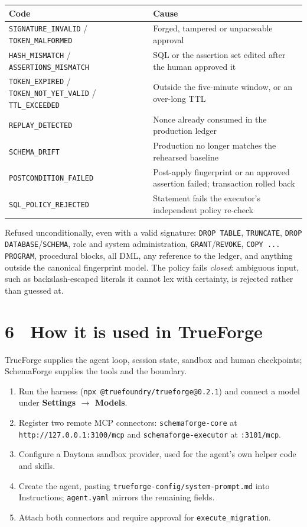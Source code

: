 \documentclass[8pt,a4paper]{extarticle}
\newcommand{\code}[1]{\texttt{\small #1}}
\begin{document}
\begin{tabularx}{\linewidth}{@{}lX@{}}
\toprule
\textbf{Code} & \textbf{Cause} \\
\midrule
\code{SIGNATURE\_INVALID} / \code{TOKEN\_MALFORMED} & Forged, tampered or unparseable approval \\
\code{HASH\_MISMATCH} / \code{ASSERTIONS\_MISMATCH} & SQL or the assertion set edited after the human approved it \\
\code{TOKEN\_EXPIRED} / \code{TOKEN\_NOT\_YET\_VALID} / \code{TTL\_EXCEEDED} & Outside the five-minute window, or an over-long TTL \\
\code{REPLAY\_DETECTED} & Nonce already consumed in the production ledger \\
\code{SCHEMA\_DRIFT} & Production no longer matches the rehearsed baseline \\
\code{POSTCONDITION\_FAILED} & Post-apply fingerprint or an approved assertion failed; transaction rolled back \\
\code{SQL\_POLICY\_REJECTED} & Statement fails the executor's independent policy re-check \\
\bottomrule
\end{tabularx}

\vspace{0.5ex}
Refused unconditionally, even with a valid signature: \code{DROP TABLE}, \code{TRUNCATE}, \code{DROP DATABASE}/\code{SCHEMA}, role and system administration, \code{GRANT}/\code{REVOKE}, \code{COPY ... PROGRAM}, procedural blocks, all DML, any reference to the ledger, and anything outside the canonical fingerprint model. The policy fails \emph{closed}: ambiguous input, such as backslash-escaped literals it cannot lex with certainty, is rejected rather than guessed at.

\section*{6 \textperiodcentered\ How it is used in TrueForge}
TrueForge supplies the agent loop, session state, sandbox and human checkpoints; SchemaForge supplies the tools and the boundary.

\begin{enumerate}
  \item Run the harness (\code{npx @truefoundry/trueforge@0.2.1}) and connect a model under \textbf{Settings $\to$ Models}.
  \item Register two remote MCP connectors: \code{schemaforge-core} at \code{http://127.0.0.1:3100/mcp} and \code{schemaforge-executor} at \code{:3101/mcp}.
  \item Configure a Daytona sandbox provider, used for the agent's own helper code and skills.
  \item Create the agent, pasting \code{trueforge-config/system-prompt.md} into Instructions; \code{agent.yaml} mirrors the remaining fields.
  \item Attach both connectors and require approval for \code{execute\_migration}.
\end{enumerate}
\end{document}
